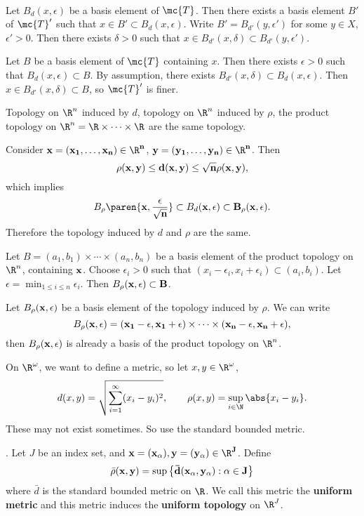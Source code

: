 \pf \\
\note{\mimp} Let \(B_d(x, \epsilon)\) be a basis element of \(\mc{T}\). Then there exists a basis element \(B'\) of \(\mc{T}'\) such that \(x \in B' \subset B_d(x, \epsilon)\). Write \(B' = B_{d'}(y, \epsilon')\) for some \(y \in X\), \(\epsilon' > 0\). Then there exists \(\delta > 0\) such that \(x \in B_{d'}(x, \delta) \subset B_{d'}(y, \epsilon')\).

\note{\mimpd} Let \(B\) be a basis element of \(\mc{T}\) containing \(x\). Then there exists \(\epsilon > 0\) such that \(B_d(x, \epsilon) \subset B\). By assumption, there exists \(B_{d'}(x, \delta) \subset B_d(x, \epsilon)\). Then \(x \in B_{d'}(x, \delta) \subset B\), so \(\mc{T}'\) is finer.

 Topology on \(\R^n\) induced by \(d\), topology on \(\R^n\) induced by \(\rho\), the product topology on \(\R^n = \R\times \cdots \times \R\) are the same topology.

\pf Consider \(\bf{x} = (x_1, \dots, x_n) \in \R^n\), \(\bf{y} = (y_1, \dots, y_n) \in \R^n\). Then
\[
    \rho(\bf{x}, \bf{y}) \leq d(\bf{x}, \bf{y}) \leq \sqrt{n}\rho(\bf{x}, \bf{y}),
\]
which implies
\[
    B_\rho\paren{\bf{x}, \frac{\epsilon}{\sqrt{n}}} \subset B_d(\bf{x}, \epsilon) \subset B_\rho(\bf{x}, \epsilon).
\]
Therefore the topology induced by \(d\) and \(\rho\) are the same.

\note{\(\supset\)} Let \(B = (a_1, b_1) \times \cdots \times (a_n, b_n)\) be a basis element of the product topology on \(\R^n\), containing \(\bf{x}\). Choose \(\epsilon_i > 0\) such that \((x_i - \epsilon_i, x_i + \epsilon_i) \subset (a_i, b_i)\). Let \(\epsilon = \min_{1\leq i \leq n} \epsilon_i\). Then \(B_\rho(\bf{x}, \epsilon) \subset B\).

\note{\(\subset\)} Let \(B_\rho(\bf{x}, \epsilon)\) be a basis element of the topology induced by \(\rho\). We can write
\[
    B_\rho(\bf{x}, \epsilon) = (x_1 - \epsilon, x_1 + \epsilon) \times \cdots \times (x_n - \epsilon, x_n + \epsilon),
\]
then \(B_\rho(\bf{x}, \epsilon)\) is already a basis of the product topology on \(\R^n\).

On \(\R^\omega\), we want to define a metric, so let \(x, y \in \R^\omega\),
\[
    d(x, y) = \sqrt{\sum_{i=1}^{\infty} (x_i - y_i)^2}, \qquad \rho(x, y) = \sup_{i \in \N} \abs{x_i - y_i}.
\]
These may not exist sometimes. So use the standard bounded metric.

. Let \(J\) be an index set, and \(\bf{x} = (x_\alpha), \bf{y} = (y_\alpha) \in \R^J\). Define
\[
    \bar{\rho}(\bf{x}, \bf{y}) = \sup\left\{\bar{d}(x_\alpha, y_\alpha) : \alpha \in J\right\}
\]
where \(\bar{d}\) is the standard bounded metric on \(\R\). We call this metric the \textbf{uniform metric} and this metric induces the \textbf{uniform topology} on \(\R^J\).

